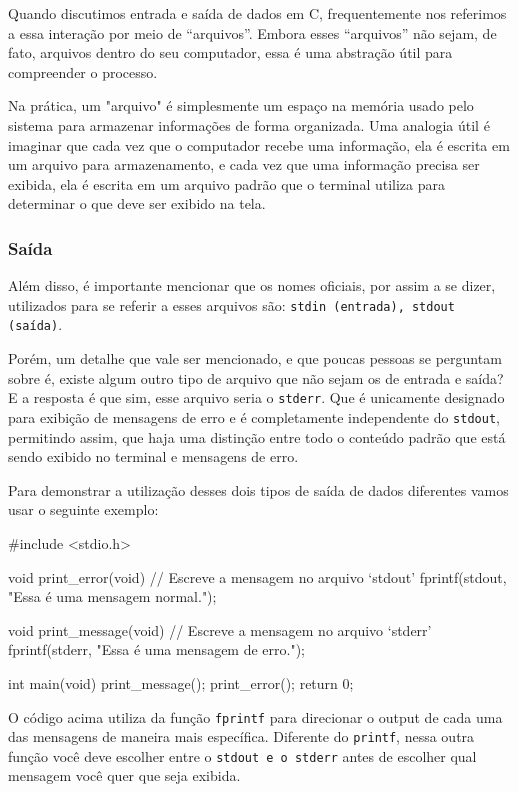 Quando discutimos entrada e saída de dados em C, frequentemente nos referimos 
a essa interação por meio de ``arquivos''. Embora esses ``arquivos'' não sejam, 
de fato, arquivos dentro do seu computador, essa é uma abstração 
útil para compreender o processo.

\label{o-que-sao-arquivos}Na prática, um "arquivo" é simplesmente um espaço na memória usado pelo 
sistema para armazenar informações de forma organizada. Uma analogia útil é 
imaginar que cada vez que o computador recebe uma informação, ela é escrita em 
um arquivo para armazenamento, e cada vez que uma informação precisa ser 
exibida, ela é escrita em um arquivo padrão que o terminal utiliza para 
determinar o que deve ser exibido na tela.

\subsubsection{Saída}

Além disso, é importante mencionar que os nomes oficiais, por assim a se dizer, 
utilizados para se referir a esses arquivos são: \texttt{stdin (entrada), 
stdout (saída)}.

Porém, um detalhe que vale ser mencionado, e que poucas pessoas se perguntam 
sobre é, existe algum outro tipo de arquivo que não sejam os de entrada e 
saída? E a resposta é que sim, esse arquivo seria o \texttt{stderr}. Que é 
unicamente designado para exibição de mensagens de erro e é completamente 
independente do \texttt{stdout}, permitindo assim, que haja uma distinção 
entre todo o conteúdo padrão que está sendo exibido no terminal e mensagens 
de erro.

Para demonstrar a utilização desses dois tipos de saída de dados diferentes 
vamos usar o seguinte exemplo:

\newpage
\begin{excode}
    #include <stdio.h>

    void print_error(void)
    {
        // Escreve a mensagem no arquivo `stdout'
        fprintf(stdout, "Essa é uma mensagem normal.");
    }

    void print_message(void)
    {
        // Escreve a mensagem no arquivo `stderr'
        fprintf(stderr, "Essa é uma mensagem de erro.");
    }

    int main(void)
    {
        print_message();
        print_error();
        return 0;
    }
\end{excode}

O código acima utiliza da função \texttt{fprintf} para direcionar o output de 
cada uma das mensagens de maneira mais específica. Diferente do \texttt{printf}, 
nessa outra função você deve escolher entre o \texttt{stdout e o stderr} antes 
de escolher qual mensagem você quer que seja exibida.

